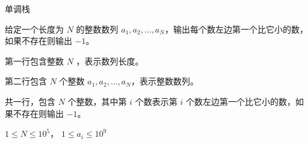 单调栈

给定一个长度为 $N$ 的整数数列 $a_1, a_2, \ldots, a_N$，输出每个数左边第一个比它小的数，如果不存在则输出 $-1$。

第一行包含整数 $N$ ，表示数列长度。

第二行包含 $N$ 个整数 $a_1, a_2, \ldots, a_N$，表示整数数列。

共一行，包含 $N$ 个整数，其中第 $i$ 个数表示第 $i$ 个数左边第一个比它小的数，如果不存在则输出 $-1$。

$1 \leq N \leq 10^5$， $1 \leq a_i \leq 10^9$
